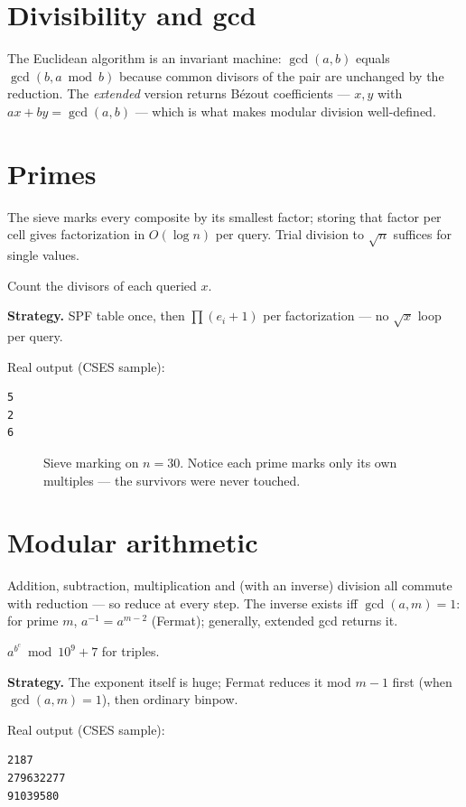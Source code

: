 \section{Divisibility and gcd}\label{sec:gcd}
The Euclidean algorithm is an invariant machine: $\gcd(a,b)$ equals
$\gcd(b, a \bmod b)$ because common divisors of the pair are
unchanged by the reduction. The \emph{extended} version returns
B\'ezout coefficients --- $x,y$ with $ax+by=\gcd(a,b)$ --- which is
what makes modular division well-defined.


\section{Primes}\label{sec:primes}
The sieve marks every composite by its smallest factor; storing that
factor per cell gives factorization in $O(\log n)$ per query.
Trial division to $\sqrt{n}$ suffices for single values.
\begin{example}\label{ex:cdiv}
Count the divisors of each queried $x$.
\par\smallskip
\textbf{Strategy.} SPF table once, then
$\prod(e_i+1)$ per factorization --- no $\sqrt{x}$ loop per query.
\par\smallskip
\begin{solution}

Real output (CSES sample):
\begin{lstlisting}[numbers=none]
5
2
6
\end{lstlisting}
\end{solution}
\end{example}
\begin{figure}[ht]\centering

\caption{Sieve marking on $n=30$. Notice each prime marks only its
own multiples --- the survivors were never touched.}
\label{fig:sieve}
\end{figure}

\section{Modular arithmetic}\label{sec:mod}
Addition, subtraction, multiplication and (with an inverse)
division all commute with reduction --- so reduce at every step.
The inverse exists iff $\gcd(a,m)=1$: for prime $m$,
$a^{-1}=a^{m-2}$ (Fermat); generally, extended gcd returns it.
\begin{example}\label{ex:exp2}
$a^{b^c} \bmod 10^9{+}7$ for triples.
\par\smallskip
\textbf{Strategy.} The exponent itself is huge; Fermat reduces it
mod $m{-}1$ first (when $\gcd(a,m)=1$), then ordinary binpow.
\par\smallskip
\begin{solution}

Real output (CSES sample):
\begin{lstlisting}[numbers=none]
2187
279632277
91039580
\end{lstlisting}
\end{solution}
\end{example}

